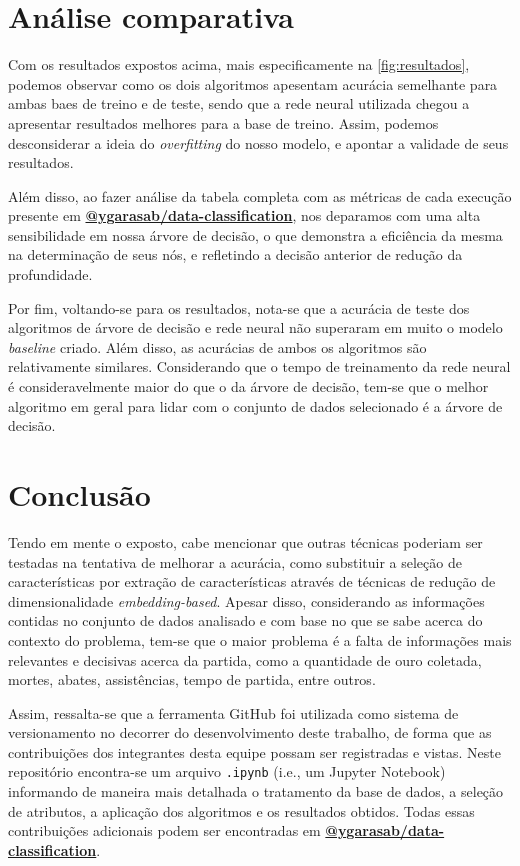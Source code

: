\documentclass[12pt]{article}
\begin{document}
\section{Análise comparativa}\label{sec:analise}

Com os resultados expostos acima, mais especificamente na \autoref{fig:resultados}, podemos observar como os dois algoritmos apesentam acurácia semelhante para ambas baes de treino e de teste, sendo que a rede neural utilizada chegou a apresentar resultados melhores para a base de treino. Assim, podemos desconsiderar a ideia do \textit{overfitting} do nosso modelo, e apontar a validade de seus resultados.

Além disso, ao fazer análise da tabela completa com as métricas de cada execução presente em \textbf{\href{https://github.com/ygarasab/data-classification}{@ygarasab/data-classification}}, nos deparamos com uma alta sensibilidade em nossa árvore de decisão, o que demonstra a eficiência da mesma na determinação de seus nós, e refletindo a decisão anterior de redução da profundidade.

Por fim, voltando-se para os resultados, nota-se que a acurácia de teste dos algoritmos de árvore de decisão e rede neural não superaram em muito o modelo \textit{baseline} criado. Além disso, as acurácias de ambos os algoritmos são relativamente similares.  Considerando que o tempo de treinamento da rede neural é consideravelmente maior do que o da árvore de decisão, tem-se que o melhor algoritmo em geral para lidar com o conjunto de dados selecionado é a árvore de decisão. 

\section{Conclusão}\label{sec:conclusao}


Tendo em mente o exposto, cabe mencionar que outras técnicas poderiam ser testadas na tentativa de melhorar a acurácia, como substituir a seleção de características por extração de características através de técnicas de redução de dimensionalidade \textit{embedding-based}. Apesar disso, considerando as informações contidas no conjunto de dados analisado e com base no que se sabe acerca do contexto do problema, tem-se que o maior problema é a falta de informações mais relevantes e decisivas acerca da partida, como a quantidade de ouro coletada, mortes, abates, assistências, tempo de partida, entre outros. 

Assim, ressalta-se que a ferramenta GitHub foi utilizada como sistema de versionamento no decorrer do desenvolvimento deste trabalho, de forma que as contribuições dos integrantes desta equipe possam ser registradas e vistas. Neste repositório encontra-se um arquivo \texttt{.ipynb} (i.e., um Jupyter Notebook) informando de maneira mais detalhada o tratamento da base de dados, a seleção de atributos, a aplicação dos algoritmos e os resultados obtidos. Todas essas contribuições adicionais podem ser encontradas em \textbf{\href{https://github.com/ygarasab/data-classification}{@ygarasab/data-classification}}.




\end{document}
